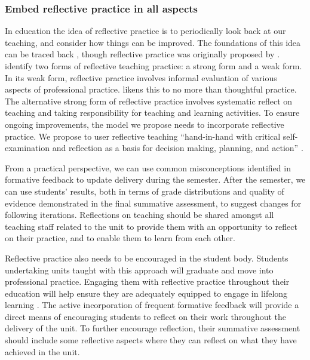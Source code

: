 \subsubsection{Embed reflective practice in all aspects} %
\label{ssub:embed_reflective_practice_in_all_aspects}

In education the idea of reflective practice is to periodically look back at our teaching, and consider how things can be improved. The foundations of this idea can be traced back \citet{Dewey:1933}, though reflective practice was originally proposed by \citet{Schon:1983}. \citet{Farrell:2007,Farrell:2008} identify two forms of reflective teaching practice: a strong form and a weak form. In its weak form, reflective practice involves informal evaluation of various aspects of professional practice. \citet{Farrell:2008} likens this to no more than thoughtful practice. The alternative strong form of reflective practice involves systematic reflect on teaching and taking responsibility for teaching and learning activities. To ensure ongoing improvements, the model we propose needs to incorporate reflective practice. We propose to user reflective teaching ``hand-in-hand with critical self-examination and reflection as a basis for decision making, planning, and action'' \cite{Richards:1994}. %

From a practical perspective, we can use common misconceptions identified in formative feedback to update delivery during the semester. After the semester, we can use students' results, both in terms of grade distributions and quality of evidence demonstrated in the final summative assessment, to suggest changes for following iterations. Reflections on teaching should be shared amongst all teaching staff related to the unit to provide them with an opportunity to reflect on their practice, and to enable them to learn from each other.

Reflective practice also needs to be encouraged in the student body. Students undertaking units taught with this approach will graduate and move into professional practice. Engaging them with reflective practice throughout their education will help ensure they are adequately equipped to engage in lifelong learning \cite{Field:2006}. The active incorporation of frequent formative feedback will provide a direct means of encouraging students to reflect on their work throughout the delivery of the unit. To further encourage reflection, their summative assessment should include some reflective aspects where they can reflect on what they have achieved in the unit. 

